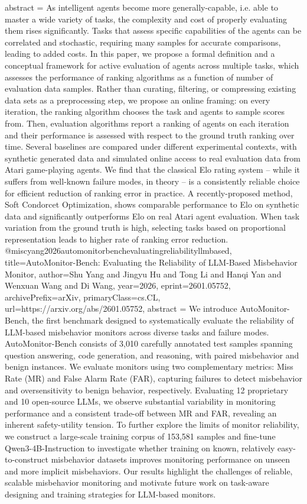 {      abstract = {As intelligent agents become more generally-capable, i.e. able to master a wide variety of tasks, the complexity and cost of properly evaluating them rises significantly. Tasks that assess specific capabilities of the agents can be correlated and stochastic, requiring many samples for accurate comparisons, leading to added costs. In this paper, we propose a formal definition and a conceptual framework for active evaluation of agents across multiple tasks, which assesses the performance of ranking algorithms as a function of number of evaluation data samples. Rather than curating, filtering, or compressing existing data sets as a preprocessing step, we propose an online framing: on every iteration, the ranking algorithm chooses the task and agents to sample scores from. Then, evaluation algorithms report a ranking of agents on each iteration and their performance is assessed with respect to the ground truth ranking over time. Several baselines are compared under different experimental contexts, with synthetic generated data and simulated online access to real evaluation data from Atari game-playing agents. We find that the classical Elo rating system -- while it suffers from well-known failure modes, in theory -- is a consistently reliable choice for efficient reduction of ranking error in practice. A recently-proposed method, Soft Condorcet Optimization, shows comparable performance to Elo on synthetic data and significantly outperforms Elo on real Atari agent evaluation. When task variation from the ground truth is high, selecting tasks based on proportional representation leads to higher rate of ranking error reduction.}
}@misc{yang2026automonitorbenchevaluatingreliabilityllmbased,
      title={AutoMonitor-Bench: Evaluating the Reliability of LLM-Based Misbehavior Monitor}, 
      author={Shu Yang and Jingyu Hu and Tong Li and Hanqi Yan and Wenxuan Wang and Di Wang},
      year={2026},
      eprint={2601.05752},
      archivePrefix={arXiv},
      primaryClass={cs.CL},
      url={https://arxiv.org/abs/2601.05752},
      abstract = {We introduce AutoMonitor-Bench, the first benchmark designed to systematically evaluate the reliability of LLM-based misbehavior monitors across diverse tasks and failure modes. AutoMonitor-Bench consists of 3,010 carefully annotated test samples spanning question answering, code generation, and reasoning, with paired misbehavior and benign instances. We evaluate monitors using two complementary metrics: Miss Rate (MR) and False Alarm Rate (FAR), capturing failures to detect misbehavior and oversensitivity to benign behavior, respectively. Evaluating 12 proprietary and 10 open-source LLMs, we observe substantial variability in monitoring performance and a consistent trade-off between MR and FAR, revealing an inherent safety-utility tension. To further explore the limits of monitor reliability, we construct a large-scale training corpus of 153,581 samples and fine-tune Qwen3-4B-Instruction to investigate whether training on known, relatively easy-to-construct misbehavior datasets improves monitoring performance on unseen and more implicit misbehaviors. Our results highlight the challenges of reliable, scalable misbehavior monitoring and motivate future work on task-aware designing and training strategies for LLM-based monitors.}
}
